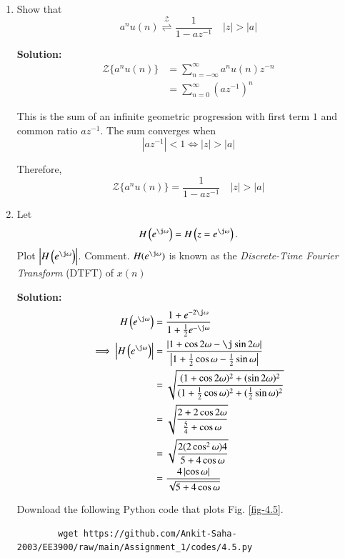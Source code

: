 \documentclass[journal,12pt,twocolumn]{IEEEtran}
\newcommand{\solution}{\noindent \textbf{Solution: }}
\providecommand{\brak}[1]{\ensuremath{\left(#1\right)}}
\providecommand{\abs}[1]{\left\vert#1\right\vert}
\providecommand{\z}[1]{{\mathcal{Z}}\{#1\}}
\providecommand{\ztrans}{\overset{\mathcal{Z}}{ \rightleftharpoons}}
\numberwithin{equation}{section}
\renewcommand\thesection{\arabic{section}}
\begin{document}
\begin{enumerate}[label=\thesection.\arabic*]
	\item Show that 
	\begin{equation}
		\label{eq:anun}
		a^nu(n) \ztrans \frac{1}{1-az^{-1}} \quad \abs{z} > \abs{a}
	\end{equation}
	
	\solution
	\begin{align}
		\z{a^nu(n)} &= \sum _{n=-\infty }^{\infty } a^nu(n)z^{-n} \\
		&= \sum _{n=0}^{\infty } \brak{az^{-1}}^{n} 
	\end{align}
	
	This is the sum of an infinite geometric progression with first term $1$ and common ratio $az^{-1}$. The sum converges when
	\begin{equation}
		\abs{az^{-1}} < 1 \iff \abs{z} > \abs{a}
	\end{equation}
	
	Therefore,
	\begin{equation}
		\z{a^nu(n)} = \frac{1}{1-az^{-1}} \quad \abs{z} > \abs{a}
	\end{equation}
	
	\item Let
	\begin{equation}
		H\brak{e^{\j \omega}} = H\brak{z = e^{\j \omega}}.
	\end{equation}
	Plot $\abs{H\brak{e^{\j \omega}}}$.  Comment.  $H(e^{\j \omega})$ is known as the {\em Discrete-Time Fourier Transform} (DTFT) of $x(n)$
	
	\solution
	\begin{align}
		H\brak{e^{\j \omega}} &= \frac{1 + e^{-2\j\omega}}{1 + \frac12 e^{-\j\omega}} \\
		\implies \abs{H\brak{e^{\j \omega}}} &= \frac{\abs{1 + \cos2\omega - \j\sin2\omega}}{\abs{1 + \frac12 \cos\omega - \frac12 \sin\omega}} \\
		&= \sqrt{\frac{(1 + \cos2\omega)^2 + (\sin2\omega)^2}{(1 + \frac12 \cos\omega)^2 + (\frac12 \sin\omega)^2}} \\
		&= \sqrt{\frac{2 + 2\cos2\omega}{\frac54 + \cos\omega}} \\
		&= \sqrt{\frac{2(2\cos^2\omega)4}{5 + 4\cos\omega} } \\
		&= \frac{4\abs{\cos\omega}}{\sqrt{5 + 4\cos\omega}}
	\end{align}
	
	Download the following Python code that plots Fig. \ref{fig-4.5}.
	\begin{lstlisting}
		wget https://github.com/Ankit-Saha-2003/EE3900/raw/main/Assignment_1/codes/4.5.py
	\end{lstlisting}
	

\end{enumerate}
\end{document}

